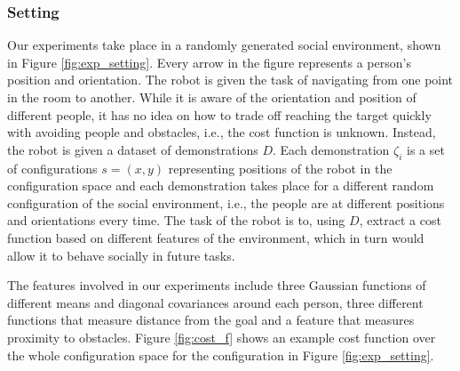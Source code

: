 \documentclass[a4paper,11pt]{report}
\begin{document}
\subsubsection{Setting}
	Our experiments take place in a randomly generated social environment, shown in Figure \ref{fig:exp_setting}. Every arrow in the figure represents a person's position and orientation. The robot is given the task of navigating from one point in the room to another. While it is aware of the orientation and position of different people, it has no idea on how to trade off reaching the target quickly with avoiding people and obstacles, i.e., the cost function is unknown. Instead, the robot is given a dataset of demonstrations $D$. Each demonstration $\zeta_i$ is a set of configurations $s = (x,y)$ representing positions of the robot in the configuration space and each demonstration takes place for a different random configuration of the social environment, i.e., the people are at different positions and orientations every time. The task of the robot is to, using $D$, extract a cost function based on different features of the environment, which in turn would allow it to behave socially in future tasks.

	The features involved in our experiments include three Gaussian functions of different means and diagonal covariances around each person, three different functions that measure distance from the goal and a feature that measures proximity to obstacles. Figure \ref{fig:cost_f} shows an example cost function over the whole configuration space for the configuration in Figure \ref{fig:exp_setting}.
\end{document}
